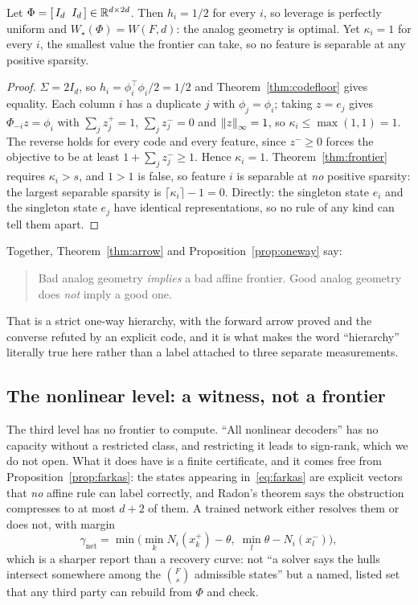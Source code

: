 \begin{proposition}
\label{prop:oneway}
Let $\Phi=[\,I_d\;\;I_d\,]\in\mathbb{R}^{d\times2d}$. Then $h_i=1/2$ for every $i$, so leverage is
perfectly uniform and $W_{\star}(\Phi)=W(F,d)$: the analog geometry is optimal. Yet
$\kappa_i=1$ for every $i$, the smallest value the frontier can take, so no feature is separable at
any positive sparsity.
\end{proposition}

\begin{proof}
$\Sigma=2I_d$, so $h_i=\phi_i^{\top}\phi_i/2=1/2$ and Theorem~\ref{thm:codefloor} gives equality.
Each column $i$ has a duplicate $j$ with $\phi_j=\phi_i$; taking $z=e_j$ gives
$\Phi_{-i}z=\phi_i$ with $\sum_jz^{+}_j=1$, $\sum_jz^{-}_j=0$ and $\left\lVert z \right\rVert_\infty=1$, so
$\kappa_i\le\max(1,1)=1$. The reverse holds for every code and every feature, since
$z^{-}\ge0$ forces the objective to be at least $1+\sum_jz^{-}_j\ge1$. Hence $\kappa_i=1$.
Theorem~\ref{thm:frontier} requires $\kappa_i>s$, and $1>1$ is false, so feature $i$ is separable
at \emph{no} positive sparsity: the largest separable sparsity is $\lceil\kappa_i\rceil-1=0$.
Directly: the singleton state $e_i$ and the singleton state $e_j$ have identical representations,
so no rule of any kind can tell them apart.
\end{proof}

Together, Theorem~\ref{thm:arrow} and Proposition~\ref{prop:oneway} say:

\begin{quote}
Bad analog geometry \emph{implies} a bad affine frontier. Good analog geometry does \emph{not}
imply a good one.
\end{quote}

That is a strict one-way hierarchy, with the forward arrow proved and the converse refuted by an
explicit code, and it is what makes the word ``hierarchy'' literally true here rather than a
label attached to three separate measurements.

\subsection{The nonlinear level: a witness, not a frontier}
\label{sec:witness}

The third level has no frontier to compute. ``All nonlinear decoders'' has no capacity without a
restricted class, and restricting it leads to sign-rank, which we do not open. What it does have
is a finite certificate, and it comes free from Proposition~\ref{prop:farkas}: the states
appearing in~\eqref{eq:farkas} are explicit vectors that \emph{no} affine rule can label
correctly, and Radon's theorem says the obstruction compresses to at most $d+2$ of them. A
trained network either resolves them or does not, with margin
\[
  \gamma_{\mathrm{net}}
  =\min\Big(\min_k N_i(x^{+}_k)-\theta,\;\min_l\theta-N_i(x^{-}_l)\Big),
\]
which is a sharper report than a recovery curve: not ``a solver says the hulls intersect
somewhere among the $\binom{F}{s}$ admissible states'' but a named, listed set that any third
party can rebuild from $\Phi$ and check.

